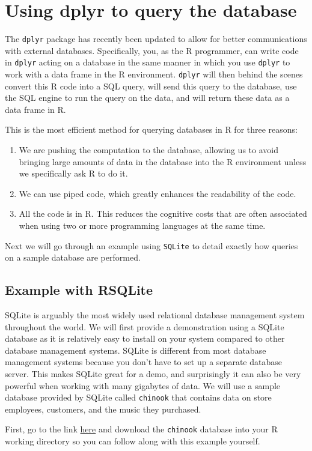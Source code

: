 \documentclass[12pt,oneside]{book}\usepackage[]{graphicx}\usepackage[]{color}
\newcommand{\be}{\begin{enumerate}}
\newcommand{\ee}{\end{enumerate}}
\begin{document}
{{{{\section{Using dplyr to query the database}

The \verb+dplyr+ package has recently been updated to allow for better communications with external databases. Specifically, you, as the R programmer, can write code in \verb+dplyr+ acting on a database in the same manner in which you use \verb+dplyr+ to work with a data frame in the R environment. \verb+dplyr+ will then behind the scenes convert this R code into a SQL query, will send this query to the database, use the SQL engine to run the query on the data, and will return these data as a data frame in R. 

This is the most efficient method for querying databases in R for three reasons: 

\be
\item We are pushing the computation to the database, allowing us to avoid bringing large amounts of data in the database into the R environment unless we specifically ask R to do it.
\item We can use piped code, which greatly enhances the readability of the code. 
\item All the code is in R. This reduces the cognitive costs that are often associated when using two or more programming languages at the same time. 
\ee

Next we will go through an example using \verb+SQLite+ to detail exactly how queries on a sample database are performed. 

\subsection{Example with RSQLite}
SQLite is arguably the most widely used relational database management system throughout the world. We will first provide a demonstration using a SQLite database as it is relatively easy to install on your system compared to other database management systems. SQLite is different from most database management systems because you don't have to set up a separate database server. This makes SQLite great for a demo, and surprisingly it can also be very powerful when working with many gigabytes of data. We will use a sample database provided by SQLite called \verb+chinook+ that contains data on store employees, customers, and the music they purchased. 

First, go to the link \href{http://www.sqlitetutorial.net/sqlite-sample-database/}{here} and download the \verb+chinook+ database into your R working directory so you can follow along with this example yourself. 

}}}}
\end{document}
